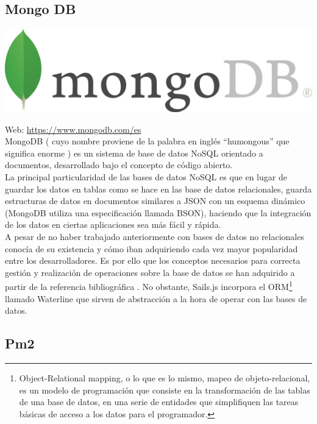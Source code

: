 \subsection{Mongo DB}

\begin{center}
\includegraphics[scale=0.5]{imagenes/mongodb-logo.png}
\end{center}


Web: \url{https://www.mongodb.com/es}\\

MongoDB ( cuyo nombre proviene de la palabra en inglés “humongous” que significa enorme ) es un sistema de base de datos NoSQL orientado a documentos, desarrollado bajo el concepto de código abierto.\\

La principal particularidad de las bases de datos NoSQL es que en lugar de guardar los datos en tablas como se hace en las base de datos relacionales, guarda estructuras de datos en documentos 
similares a JSON con un esquema dinámico (MongoDB utiliza una especificación llamada BSON), haciendo que la integración de los datos en ciertas aplicaciones sea más fácil y rápida.\\

A pesar de no haber trabajado anteriormente con bases de datos no relacionales conocía de su existencia y cómo iban adquiriendo cada vez mayor popularidad entre los desarrolladores. Es por ello
que los conceptos necesarios para correcta gestión y realización de operaciones sobre la base de datos se han adquirido a partir de la referencia bibliográfica \cite{book:MongoDB}.
No obstante, Sails.js incorpora el ORM\footnote{Object-Relational mapping, o lo que es lo mismo, mapeo de objeto-relacional, es un modelo de programación que consiste en la transformación
de las tablas de una base de datos, en una serie de entidades que simplifiquen las tareas básicas de acceso a los datos para el programador.} llamado Waterline que sirven de abstracción a la hora de operar
con las bases de datos. 

\subsection{Pm2}

